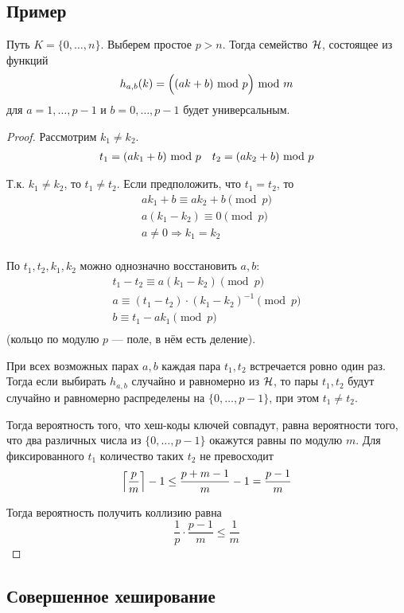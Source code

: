 \subsection{Пример}
\begin{theorem}
    Путь $K = \{0, \ldots, n\}$.
    Выберем простое $p > n$.
    Тогда семейство $\mathcal{H}$,
    состоящее из функций
    \[ h_{a, b}(k) = \Bigl( (ak + b) ~\text{mod}~ p \Bigr) ~\text{mod}~ m \]
    для $a = 1, \ldots, p - 1$ и $b = 0, \ldots, p - 1$
    будет универсальным.
\end{theorem}
\begin{proof}
    Рассмотрим $k_1 \ne k_2$.
    \begin{align*}
        & t_1 = (ak_1 + b) ~\text{mod}~ p &
        & t_2 = (ak_2 + b) ~\text{mod}~ p \\
    \end{align*}

    Т.к. $k_1 \ne k_2$, то $t_1 \ne t_2$.
    Если предположить, что $t_1 = t_2$,
    то
    \begin{gather*}
        ak_1 + b \equiv ak_2 + b \pmod{p} \\
        a(k_1 - k_2) \equiv 0 \pmod{p} \\
        a \ne 0 \Rightarrow k_1 = k_2 \\
    \end{gather*}

    По $t_1, t_2, k_1, k_2$ можно однозначно восстановить $a, b$:
    \begin{gather*}
        t_1 - t_2 \equiv a(k_1 - k_2) \pmod{p} \\
        a \equiv (t_1 - t_2) \cdot (k_1 - k_2)^{-1} \pmod{p} \\
        b \equiv t_1 - a k_1 \pmod{p} \\
    \end{gather*}
    (кольцо по модулю $p$ --- поле, в нём есть деление).

    При всех возможных парах $a, b$
    каждая пара $t_1, t_2$ встречается ровно один раз.
    Тогда если выбирать $h_{a, b}$ случайно и равномерно из $\mathcal{H}$,
    то пары $t_1, t_2$ будут случайно и равномерно
    распределены на $\{0, \ldots, p - 1\}$,
    при этом $t_1 \ne t_2$.

    Тогда вероятность того, что хеш-коды ключей совпадут,
    равна вероятности того, что два различных числа
    из $\{0, \ldots, p - 1\}$ окажутся равны по модулю $m$.
    Для фиксированного $t_1$ количество таких $t_2$ не превосходит
    \[
        \left \lceil \frac{p}{m} \right \rceil - 1
        \le \frac{p + m - 1}{m} - 1
        = \frac{p - 1}{m}
    \]

    Тогда вероятность получить коллизию равна
    \[
        \frac{1}{p} \cdot \frac{p - 1}{m} \le \frac{1}{m}
    \]
\end{proof}

\subsection{Совершенное хеширование}

